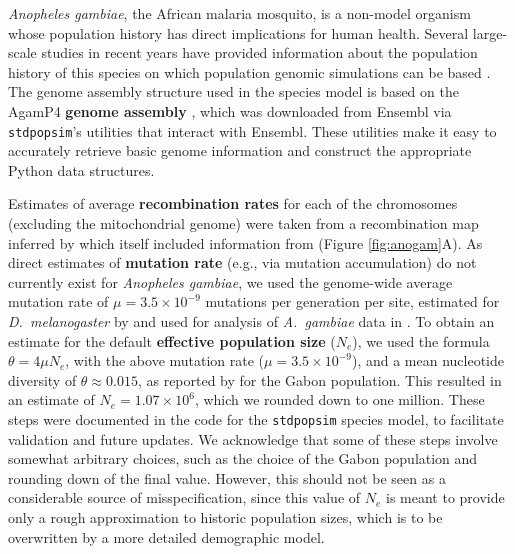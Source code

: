 \documentclass[hidelinks]{article}
\newcommand{\stdpopsim}{\texttt{stdpopsim}\xspace}
\providecommand{\DIFdelbegin}{} %
\newcommand{\DIFscaledelfig}{0.5}
\newlength{\DIFdelgraphicswidth} %
\newlength{\DIFdelgraphicsheight} %
\newcommand{\DIFdelincludegraphics}[2][]{%
\sbox{\DIFdelgraphicsbox}{\DIFOincludegraphics[#1]{#2}}%
\settoboxwidth{\DIFdelgraphicswidth}{\DIFdelgraphicsbox} %
\settoboxtotalheight{\DIFdelgraphicsheight}{\DIFdelgraphicsbox} %
\scalebox{\DIFscaledelfig}{%
\parbox[b]{\DIFdelgraphicswidth}{\usebox{\DIFdelgraphicsbox}\\[-\baselineskip] \rule{\DIFdelgraphicswidth}{0em}}\llap{\resizebox{\DIFdelgraphicswidth}{\DIFdelgraphicsheight}{%
\setlength{\unitlength}{\DIFdelgraphicswidth}%
\begin{picture}(1,1)%
\thicklines\linethickness{2pt} %
{\color[rgb]{1,0,0}\put(0,0){\framebox(1,1){}}}%
{\color[rgb]{1,0,0}\put(0,0){\line( 1,1){1}}}%
{\color[rgb]{1,0,0}\put(0,1){\line(1,-1){1}}}%
\end{picture}%
}\hspace*{3pt}}} %
} %
\DeclareRobustCommand{\DIFdelbegin}{\DIFOdelbegin \let\includegraphics\DIFdelincludegraphics} %
\begin{document}
\emph{Anopheles gambiae}, the African malaria mosquito, is 
a non-model organism whose population history has direct implications for human health.
Several large-scale studies in recent years have provided information about the
population history of this species on which population genomic simulations can be based \citep[e.g.,][]{Miles2017, clarkson2020genome}.
The genome assembly structure used in the species model is based 
on the AgamP4 \textbf{genome assembly} \citep{Sharakhova2007}, which 
was downloaded from Ensembl \citep{ensembl2021} via \stdpopsim's
utilities that interact with Ensembl. These utilities
make it easy to accurately retrieve basic genome information and construct the appropriate Python data structures.

Estimates of average \textbf{recombination rates} for each of the chromosomes (excluding the mitochondrial genome)
were taken from a recombination map inferred by \citet{Pombi2006} which itself included information from
\citet{zheng1996integrated} (Figure \ref{fig:anogam}A).
As direct estimates of \textbf{mutation rate} (e.g., via mutation accumulation) do not currently exist for \emph{Anopheles gambiae},
we used the genome-wide average mutation rate of $\mu=3.5 \times 10^{-9}$ mutations per generation per site,
estimated for \textit{D.~melanogaster} by \cite{Keightley2009}
and used for analysis of \textit{A.~gambiae} data in \citet{Miles2017}.
To obtain an estimate for the default \textbf{effective population size} ($N_e$),
we used the formula $\theta=4\mu N_e$,
with the above mutation rate ($\mu=3.5 \times 10^{-9}$),
and a mean nucleotide diversity of $\theta\approx 0.015$,
as reported by \citet{Miles2017} for the Gabon population.
This resulted in an estimate of $N_e=1.07\times 10^{6}$,
which we rounded down to one million. 
These steps were documented in the code for the \stdpopsim species model,
to facilitate validation and future updates.
We acknowledge that some of these steps involve somewhat arbitrary choices,
such as the choice of the Gabon population and rounding down of the final value.
However, this should not be seen as a considerable source of misspecification,
since this value of $N_e$ is meant to provide only a rough approximation to
historic population sizes, which is to be overwritten by a more detailed demographic model.
\DIFdelbegin %
\end{document}
